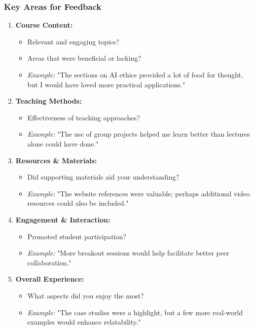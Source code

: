 \documentclass[aspectratio=169]{beamer}
\begin{document}
\begin{frame}[fragile]
    \frametitle{Key Areas for Feedback}
    \begin{enumerate}
        \item \textbf{Course Content:} 
        \begin{itemize}
            \item Relevant and engaging topics?
            \item Areas that were beneficial or lacking?
            \item \textit{Example:} "The sections on AI ethics provided a lot of food for thought, but I would have loved more practical applications."
        \end{itemize}
        
        \item \textbf{Teaching Methods:} 
        \begin{itemize}
            \item Effectiveness of teaching approaches?
            \item \textit{Example:} "The use of group projects helped me learn better than lectures alone could have done."
        \end{itemize}

        \item \textbf{Resources \& Materials:} 
        \begin{itemize}
            \item Did supporting materials aid your understanding?
            \item \textit{Example:} "The website references were valuable; perhaps additional video resources could also be included."
        \end{itemize}

        \item \textbf{Engagement \& Interaction:} 
        \begin{itemize}
            \item Promoted student participation?
            \item \textit{Example:} "More breakout sessions would help facilitate better peer collaboration."
        \end{itemize}

        \item \textbf{Overall Experience:}
        \begin{itemize}
            \item What aspects did you enjoy the most?
            \item \textit{Example:} "The case studies were a highlight, but a few more real-world examples would enhance relatability."
        \end{itemize}
    \end{enumerate}
\end{frame}
\end{document}
